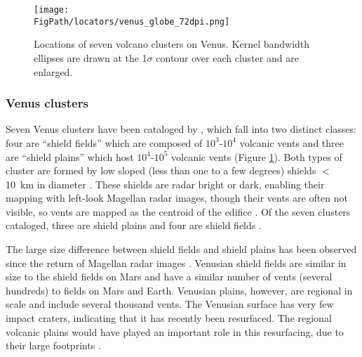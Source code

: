 \begin{figure}
\centering
\texttt{[image: \\FigPath/locators/venus\_globe\_72dpi.png]}
\caption[Locations of seven volcano clusters on Venus]{Locations of seven volcano clusters on Venus. Kernel bandwidth ellipses are drawn at the 1$\sigma$ contour over each cluster and are enlarged.}
\label{fig_venuslocator}
\end{figure}

\subsubsection{Venus clusters}
Seven Venus clusters have been cataloged by \citet{miller2012shield}, which fall into two distinct classes: four are ``shield fields'' which are composed of $10^3$-$10^4$ volcanic vents and three are ``shield plains'' which host $10^4$-$10^5$ volcanic vents (Figure \ref{fig_venuslocator}). Both types of cluster are formed by low sloped (less than one to a few degrees) shields $<$10~km in diameter \citep{richardson2012comparison}. These shields are radar bright or dark, enabling their mapping with left-look Magellan radar images, though their vents are often not visible, so vents are mapped as the centroid of the edifice \citep{miller2012shield}. Of the seven clusters cataloged, three are shield plains and four are shield fields \citep{miller2012shield}.

The large size difference between shield fields and shield plains has been observed since the return of Magellan radar images \citep{head1992venus}. Venusian shield fields are similar in size to the shield fields on Mars and have a similar number of vents (several hundreds) to fields on Mars and Earth. Venusian plains, however, are regional in scale and include several thousand vents. The Venusian surface has very few impact craters, indicating that it has recently been resurfaced. The regional volcanic plains would have played an important role in this resurfacing, due to their large footprints \citep{guest1992small}.

